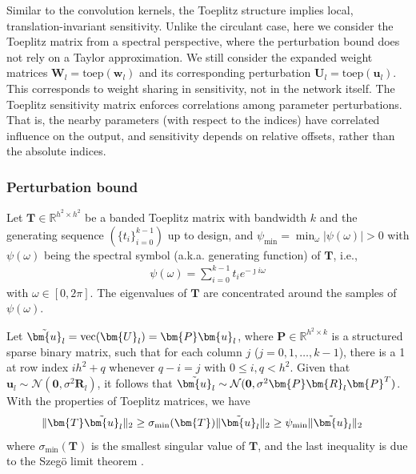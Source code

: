 \documentclass[journal]{IEEEtran} %
\def\vu{{\bm{u}}}
\def\vw{{\bm{w}}}
\def\mP{{\bm{P}}}
\def\mR{{\bm{R}}}
\def\mT{{\bm{T}}}
\def\mU{{\bm{U}}}
\def\mW{{\bm{W}}}
\newcommand{\R}{\mathbb{R}}
\newcommand{\Norm}[1]{\|#1\|}
\newcommand{\Abs}[1]{|#1|}
\begin{document}
Similar to the convolution kernels, the Toeplitz structure implies local, translation-invariant sensitivity.
Unlike the circulant case, here we consider the Toeplitz matrix from a spectral perspective, where the perturbation bound does not rely on a Taylor approximation. We still consider the expanded weight matrices $\mW_l = \mathrm{toep}(\vw_l)$ and its corresponding perturbation $\mU_l = \mathrm{toep}(\vu_l)$.
% 
This corresponds to weight sharing in sensitivity, not in the network itself.
The Toeplitz sensitivity matrix enforces correlations among parameter perturbations. That is,
the nearby parameters (with respect to the indices) have correlated influence on the output, and sensitivity depends on relative offsets, rather than the absolute indices.

\subsubsection{Perturbation bound}
Let $\mT \in \R^{h^2 \times h^2}$ be a banded Toeplitz matrix with bandwidth $k$ and the generating sequence $(\{t_i\}_{i=0}^{k-1})$ up to design, and $\psi_{\min} = \min_{\omega} \Abs{\psi(\omega)} >0$ with $\psi(\omega)$ being
the spectral symbol (a.k.a. generating function) of $\mT$, i.e.,
\begin{align}
    \psi(\omega) = \sum_{i=0}^{k-1} t_i e^{-\jmath i\omega} 
\end{align}
with $\omega \in [0,2\pi]$. The eigenvalues of $\mT$ are concentrated around the samples of $\psi(\omega)$. 
% 





Let $\Tilde{\vu}_l=\mathrm{vec}(\mU_l)= \mP \vu_l$, where $\mP \in \R^{h^2 \times k}$ is a structured sparse binary matrix, such that for each column $j$ ($j=0,1,\dots,k-1$), there is a 1 at row index $ih^2+q$ whenever $q-i=j$ with $0 \le i,q < h^2$.
Given that  $\vu_l \sim \mathcal{N}(\mathbf{0},\sigma^2\mR_l)$, it follows that $\Tilde{\vu}_l \sim \mathcal{N}(\mathbf{0}, \sigma^2\mP \mR_l \mP^T)$.
% 
With the properties of Toeplitz matrices, we have
\begin{align} \label{eq:toeplitz-norm}
     \Norm{\mT \Tilde{\vu}_l}_2 &\ge \sigma_{\min}(\mT) \Norm{\Tilde{\vu}_l}_2 \ge \psi_{\min} \Norm{\Tilde{\vu}_l}_2 
\end{align}
where $\sigma_{\min}(\mT)$ is the smallest singular value of $\mT$, and the last inequality is due to the Szeg\"{o} limit theorem \cite{gray2006toeplitz}. 
\end{document}
